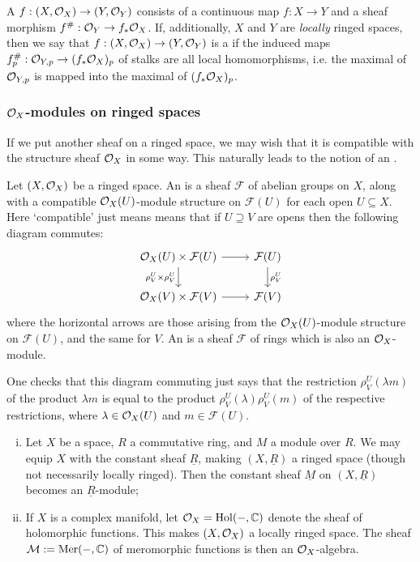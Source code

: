 \begin{defn}
	A  $f : (X, \mathcal{O}_X) \to (Y, \mathcal{O}_Y)$  consists of a continuous map $f : X \to Y$ and a sheaf morphism $f^\# : \mathcal{O}_Y \to f_*\mathcal{O}_X$. If, additionally, $X$ and $Y$ are \emph{locally} ringed spaces, then we say that $f : (X, \mathcal{O}_X) \to (Y, \mathcal{O}_Y)$ is a  if the induced maps $f^\#_p : \mathcal{O}_{Y, p} \to (f_*\mathcal{O}_X)_p$ of stalks are all local homomorphisms, i.e. the maximal of $\mathcal{O}_{Y, p}$ is mapped into the maximal of $(f_*\mathcal{O}_{X})_p$.
\end{defn}

\subsubsection{\texorpdfstring{$\mathcal{O}_X$}{O}-modules on ringed spaces}
\label{subsubsec:A_4_1_O-modules}
If we put another sheaf on a ringed space, we may wish that it is compatible with the structure sheaf $\mathcal{O}_X$ in some way. This naturally leads to the notion of an .

\begin{defn}
	Let $(X, \mathcal{O}_X)$ be a ringed space. An  is a sheaf $\mathcal{F}$ of abelian groups on $X$, along with a compatible $\mathcal{O}_X(U)$-module structure on $\mathcal{F}(U)$ for each open $U \subseteq X$. Here `compatible' just means means that if $U \supseteq V$ are opens then the following diagram commutes:
	\[
		\begin{tikzcd}
			\ints_X(U) \times \mathcal{F}(U) \rar \dar["\rho^U_V \times \rho^U_V"'] & \mathcal{F}(U) \dar["\rho^U_V"] \\
			\ints_X(V) \times \mathcal{F}(V) \rar & \mathcal{F}(V)
		\end{tikzcd}
	\]
	where the horizontal arrows are those arising from the $\mathcal{O}_X(U)$-module structure on $\mathcal{F}(U)$, and the same for $V$. An  is a sheaf $\mathcal{F}$ of rings which is also an $\mathcal{O}_X$-module.
\end{defn}

One checks that this diagram commuting just says that the restriction $\rho^U_V(\lambda m)$ of the product $\lambda m$ is equal to the product $\rho^U_V (\lambda) \rho^U_V(m)$ of the respective restrictions, where $\lambda \in \mathcal{O}_X(U)$ and $m \in \mathcal{F}(U)$.

\begin{eg}
	\begin{enumerate}[(i)]
		\item Let $X$ be a space, $R$ a commutative ring, and $M$ a module over $R$. We may equip $X$ with the constant sheaf $\underline{R}$, making $(X,\underline{R})$ a ringed space (though not necessarily locally ringed). Then the constant sheaf $\underline{M}$ on $(X,\underline{R})$ becomes an $\underline{R}$-module;
		\item If $X$ is a complex manifold, let $\mathcal{O}_X = \mathrm{Hol}(-, \mathbb{C})$ denote the sheaf of holomorphic functions. This makes $(X, \mathcal{O}_X)$ a locally ringed space. The sheaf $\mathcal{M} := \mathrm{Mer}(-, \mathbb{C})$ of meromorphic functions is then an $\mathcal{O}_X$-algebra.
	\end{enumerate}
\end{eg}